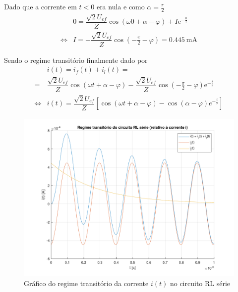 \documentclass[a4paper, titlepage, portuguese]{article}
\newcommand{\eq}{\Leftrightarrow} %
\newcommand\e{\mathrm{e} }
\begin{document}
		Dado que a corrente em $t < 0$ era nula e como $\alpha = \frac{\pi}{2}$
		\begin{align*}
			&0 =  \dfrac{\sqrt{2}U_{ef}}{Z} \cos\left(\omega 0 + \alpha - \varphi\right) + I \e^{-\frac{0}{\tau}} \\ \eq
			&I = - \dfrac{\sqrt{2}U_{ef}}{Z} \cos\left(- \frac{\pi}{2} - \varphi\right) = \SI{0.445}{\milli\ampere}
		\end{align*}
		\par
		Sendo o regime transitório finalmente dado por
		\begin{align*}
			&i(t) = i_f(t) + i_l(t) = \\ =
			&\dfrac{\sqrt{2}U_{ef}}{Z} \cos\left(\omega t + \alpha - \varphi\right) - \dfrac{\sqrt{2}U_{ef}}{Z} \cos\left(- \frac{\pi}{2} - \varphi\right) \e^{-\frac{t}{\tau}} \\ \eq
			&i(t) = \dfrac{\sqrt{2}U_{ef}}{Z} \left[ \cos\left(\omega t + \alpha - \varphi\right) - \cos\left(\alpha - \varphi\right)e^{-\frac{t}{\tau}}\right]
		\end{align*}

		\begin{figure}[H]
			\centering
			\includegraphics[width=1.0\linewidth]{rl.pdf}
			\caption{Gráfico do regime transitório da corrente $i(t)$ no circuito RL série}
			\label{fig:rl}
		\end{figure}

	\subsubsection{}
\end{document}
